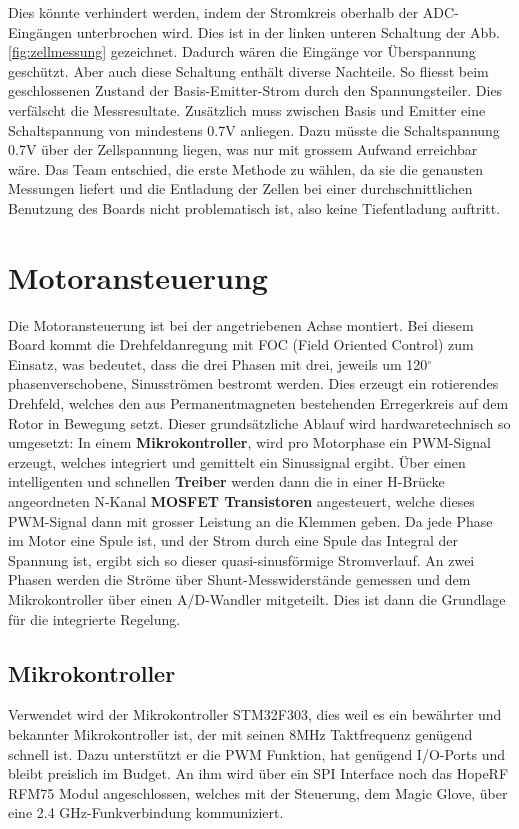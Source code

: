 Dies könnte verhindert werden, indem der Stromkreis oberhalb der ADC-Eingängen unterbrochen wird. Dies ist in der linken unteren Schaltung der Abb.\ref{fig:zellmessung} gezeichnet. Dadurch wären die Eingänge vor Überspannung geschützt. Aber auch diese Schaltung enthält diverse Nachteile. So fliesst beim geschlossenen Zustand der Basis-Emitter-Strom durch den Spannungsteiler. Dies verfälscht die Messresultate. Zusätzlich muss zwischen Basis und Emitter eine Schaltspannung von mindestens 0.7V anliegen. Dazu müsste die Schaltspannung 0.7V über der Zellspannung liegen, was nur mit grossem Aufwand erreichbar wäre. 
Das Team entschied, die erste Methode zu wählen, da sie die genausten Messungen liefert und die Entladung der Zellen bei einer durchschnittlichen Benutzung des Boards nicht problematisch ist, also keine Tiefentladung auftritt.

\section{Motoransteuerung}
\label{HW_Motoransteuerung}
Die Motoransteuerung ist bei der angetriebenen Achse montiert. Bei diesem Board kommt die Drehfeldanregung mit FOC (Field Oriented Control) zum Einsatz, was bedeutet, dass die drei Phasen mit drei, jeweils um 120\(^\circ\) phasenverschobene, Sinusströmen bestromt werden. Dies erzeugt ein rotierendes Drehfeld, welches den aus Permanentmagneten bestehenden Erregerkreis auf dem Rotor in Bewegung setzt. Dieser grundsätzliche Ablauf wird hardwaretechnisch so umgesetzt:
In einem \textbf{Mikrokontroller}, wird pro Motorphase ein PWM-Signal erzeugt, welches integriert und gemittelt ein Sinussignal ergibt. Über einen intelligenten und schnellen \textbf{Treiber} werden dann die in einer H-Brücke angeordneten N-Kanal \textbf{MOSFET Transistoren} angesteuert, welche dieses PWM-Signal dann mit grosser Leistung an die Klemmen geben. Da jede Phase im Motor eine Spule ist, und der Strom durch eine Spule das Integral der Spannung ist, ergibt sich so dieser quasi-sinusförmige Stromverlauf.
An zwei Phasen werden die Ströme über Shunt-Messwiderstände gemessen und dem Mikrokontroller über einen A/D-Wandler mitgeteilt. Dies ist dann die Grundlage für die integrierte Regelung.

\subsection*{Mikrokontroller}
Verwendet wird der Mikrokontroller STM32F303, dies weil es ein bewährter und bekannter Mikrokontroller ist, der mit seinen 8MHz Taktfrequenz genügend schnell ist. Dazu unterstützt er die PWM Funktion, hat genügend I/O-Ports und bleibt preislich im Budget.
An ihm wird über ein SPI Interface noch das HopeRF RFM75 Modul angeschlossen, welches mit der Steuerung, dem Magic Glove, über eine 2.4 GHz-Funkverbindung kommuniziert.

